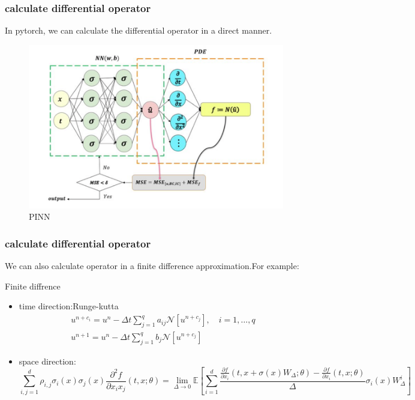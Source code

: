 \documentclass[8pt,aspectratio=15,mathserif]{beamer}
\begin{document}
\begin{frame}
\frametitle{calculate differential operator}
In pytorch, we can calculate the differential operator in a direct manner.
\begin{figure}
\centering
\includegraphics[width=0.6\linewidth]{img/PINN.png}
\caption{PINN\cite{PINN}}
\end{figure}
\end{frame}

\begin{frame}
\frametitle{calculate differential operator}
We can also calculate operator in a finite difference approximation.For example:
\begin{block}{Finite diffrence}\small
\begin{itemize}
\item time direction:Runge-kutta\cite{PINN}
$$
\begin{array}{l}
u^{n+c_{i}}=u^{n}-\Delta t \sum_{j=1}^{q} a_{i j} \mathcal{N}\left[u^{n+c_{j}}\right], \quad i=1, \ldots, q \\
u^{n+1}=u^{n}-\Delta t \sum_{j=1}^{q} b_{j} \mathcal{N}\left[u^{n+c_{j}}\right]
\end{array}
$$
\item space direction:\cite{DGM}
$$
\sum_{i, j=1}^{d} \rho_{i, j} \sigma_{i}(x) \sigma_{j}(x) \frac{\partial^{2} f}{\partial x_{i} x_{j}}(t, x ; \theta)=\lim _{\Delta \rightarrow 0} \mathbb{E}\left[\sum_{i=1}^{d} \frac{\frac{\partial f}{\partial x_{i}}\left(t, x+\sigma(x) W_{\Delta} ; \theta\right)-\frac{\partial f}{\partial x_{i}}(t, x ; \theta)}{\Delta} \sigma_{i}(x) W_{\Delta}^{i}\right]
$$
\end{itemize}
\end{block}
\end{frame}
\end{document}
